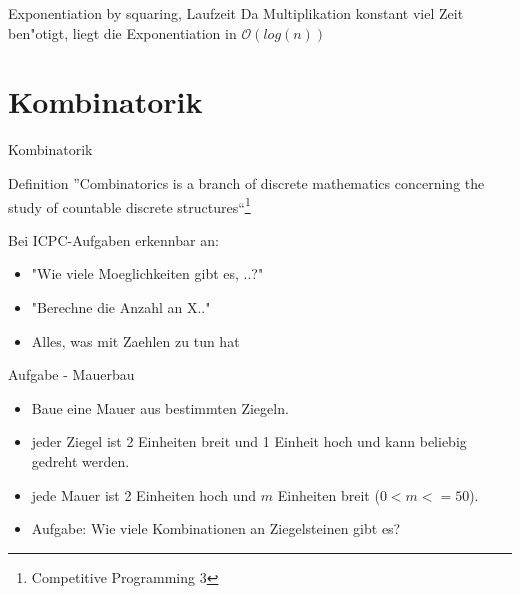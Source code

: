 \documentclass[18pt]{beamer}
\begin{document}
\begin{algorithm}
\scriptsize 
\caption{Exponentiation(n, x) (rekursiv)}
\begin{algorithmic}
\ENDIF
{}
\ENDIF
{}
\ELSE
{}
\ENDIF
\ENDWHILE
\end{algorithmic}
\end{algorithm}

\begin{frame} {Exponentiation by squaring, Laufzeit}
Da Multiplikation konstant viel Zeit ben"otigt, liegt die Exponentiation in $\mathcal{O}(log(n))$
\end{frame}


\section{Kombinatorik}


\begin{frame}{Kombinatorik}
\begin{block}{Definition}
	''Combinatorics is a branch of discrete mathematics concerning the study of countable discrete structures``\footnote{Competitive Programming 3}
\end{block}

Bei ICPC-Aufgaben erkennbar an:
\begin{itemize}
	\item "Wie viele Moeglichkeiten gibt es, ..?"
	\item "Berechne die Anzahl an X.."
	\item Alles, was mit Zaehlen zu tun hat
\end{itemize}
\end{frame}


\begin{frame}{Aufgabe - Mauerbau}
\begin{itemize}
	\item Baue eine Mauer aus bestimmten Ziegeln.
	\item jeder Ziegel ist 2 Einheiten breit und 1 Einheit hoch und kann beliebig gedreht werden.
	\item jede Mauer ist 2 Einheiten hoch und \(m\) Einheiten breit (\(0<m<=50\)). 
	\item Aufgabe: Wie viele Kombinationen an Ziegelsteinen gibt es?
\end{itemize}
\end{frame}
\end{document}
